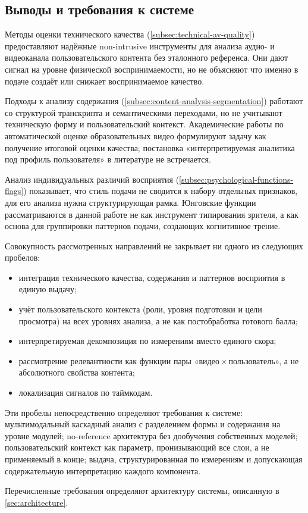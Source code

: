 \subsection{Выводы и требования к системе}
\label{subsec:conclusions-and-requirements}
Методы оценки технического качества (\cref{subsec:technical-av-quality})
предоставляют надёжные non-intrusive инструменты для анализа аудио- и видеоканала
пользовательского контента без эталонного референса.
Они дают сигнал на уровне физической воспринимаемости, но не объясняют
что именно в подаче создаёт или снижает воспринимаемое качество.

Подходы к анализу содержания (\cref{subsec:content-analysis-segmentation})
работают со структурой транскрипта и семантическими переходами,
но не учитывают техническую форму и пользовательский контекст.
Академические работы по автоматической оценке образовательных видео 
\cite{shi2019lecturevideoquality,pan2022multimodal,zhu2025vceval}
формулируют задачу как получение итоговой оценки качества;
постановка «интерпретируемая аналитика под профиль пользователя» в литературе не встречается.

Анализ индивидуальных различий восприятия (\cref{subsec:psychological-functions-flags})
показывает, что стиль подачи не сводится к набору отдельных признаков, 
для его анализа нужна структурирующая рамка.
Юнговские функции рассматриваются в данной работе не как инструмент типирования зрителя,
а как основа для группировки паттернов подачи, создающих когнитивное трение.

Совокупность рассмотренных направлений не закрывает ни одного из следующих пробелов:
\begin{itemize}
    \item интеграция технического качества, содержания и паттернов восприятия в единую выдачу;
    \item учёт пользовательского контекста (роли, уровня подготовки и цели просмотра) на всех уровнях анализа, а не как постобработка готового балла;
    \item интерпретируемая декомпозиция по измерениям вместо единого скора;
    \item рассмотрение релевантности как функции пары «видео\,×\,пользователь», а не абсолютного свойства контента;
    \item локализация сигналов по таймкодам.
\end{itemize}

Эти пробелы непосредственно определяют требования к системе:
мультимодальный каскадный анализ с разделением формы и содержания на уровне модулей;
no-reference архитектура без дообучения собственных моделей;
пользовательский контекст как параметр, пронизывающий все слои, а не применяемый в конце;
выдача, структурированная по измерениям и допускающая содержательную интерпретацию каждого компонента.

Перечисленные требования определяют архитектуру системы,
описанную в \cref{sec:architecture}.